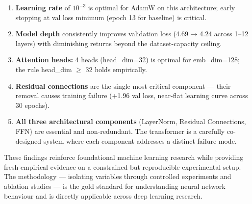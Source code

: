 \documentclass[12pt,a4paper]{article}
\begin{document}
\begin{enumerate}[leftmargin=2cm]
  \item \textbf{Learning rate} of $10^{-3}$ is optimal for AdamW on this architecture; early stopping at val loss minimum (epoch 13 for baseline) is critical.

  \item \textbf{Model depth} consistently improves validation loss (4.69 → 4.24 across 1–12 layers) with diminishing returns beyond the dataset-capacity ceiling.

  \item \textbf{Attention heads:} 4 heads (head\_dim=32) is optimal for emb\_dim=128; the rule head\_dim $\geq$ 32 holds empirically.

  \item \textbf{Residual connections} are the single most critical component — their removal causes training failure (+1.96 val loss, near-flat learning curve across 30 epochs).

  \item \textbf{All three architectural components} (LayerNorm, Residual Connections, FFN) are essential and non-redundant. The transformer is a carefully co-designed system where each component addresses a distinct failure mode.
\end{enumerate}

These findings reinforce foundational machine learning research while providing fresh empirical evidence on a constrained but reproducible experimental setup. The methodology — isolating variables through controlled experiments and ablation studies — is the gold standard for understanding neural network behaviour and is directly applicable across deep learning research.
\end{document}
